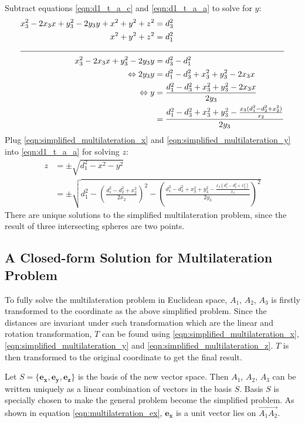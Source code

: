 \documentclass[\main/thesis.tex]{subfiles}
\begin{document}
Subtract equations \ref{eqn:d1_t_a_c} and \ref{eqn:d1_t_a_a} to solve for $y$:
\begin{equation}
    \begin{split}
        x_3^2  - 2x_3x + y_3^2 - 2y_3y + x^2 + y^2 + z^2 &= d_3^2 \\
        x^2 + y^2 + z^2 &= d_1^2 \\
        \cline{1-2}
        x_3^2  - 2x_3x + y_3^2 - 2y_3y &= d_3^2 - d_1^2\\
        \Leftrightarrow 2y_3y &= d_1^2 - d_3^2 + x_3^2 + y_3^2 - 2x_3x \\
        \Leftrightarrow y &= \frac{d_1^2 - d_3^2 + x_3^2 + y_3^2 - 2x_3x}{2y_3} \\
        &= \frac{d_1^2 - d_3^2 + x_3^2 + y_3^2 - \frac{x_3(d_1^2 - d_2^2 + x_2^2)}{x_2}}{2y_3}
    \end{split}
    \label{eqn:simplified_multilateration_y}
\end{equation}
Plug \ref{eqn:simplified_multilateration_x} and \ref{eqn:simplified_multilateration_y} into \ref{eqn:d1_t_a_a} for solving $z$:
\begin{equation}
    \begin{split}
        z &= \pm \sqrt{d_1^2 - x^2 - y^2} \\
        &= \pm \sqrt{d_1^2 - \left(\frac{d_1^2 - d_2^2 + x_2^2}{2x_2}\right)^2 - \left(\frac{d_1^2 - d_3^2 + x_3^2 + y_3^2 - \frac{x_3(d_1^2 - d_2^2 + x_2^2)}{x_2}}{2y_3}\right)^2}
    \end{split}
    \label{eqn:simplified_multilateration_z}
\end{equation}
There are unique solutions to the simplified multilateration problem, since the result of three intersecting spheres are two points.

\subsection{A Closed-form Solution for Multilateration Problem}
To fully solve the multilateration problem in Euclidean space, $A_1$, $A_2$, $A_3$ is firstly transformed to the coordinate as the above simplified problem. Since the distances are invariant under such transformation which are the linear and rotation transformation, $T$ can be found using \ref{eqn:simplified_multilateration_x}, \ref{eqn:simplified_multilateration_y} and \ref{eqn:simplified_multilateration_z}. $T$ is then transformed to the original coordinate to get the final result.

Let $S =\{\boldsymbol{e_x}, \boldsymbol{e_y}, \boldsymbol{e_z}\}$ is the basis of the new vector space. Then $A_1$, $A_2$, $A_3$ can be written uniquely as a linear combination of vectors in the basis $S$. Basis $S$ is specially chosen to make the general problem become the simplified problem. As shown in equation \ref{eqn:multilateration_ex}, $\boldsymbol{e_x}$ is a unit vector lies on $\overrightarrow{A_1A_2}$.
\end{document}
